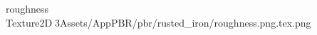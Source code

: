 	   roughness             	   Texture2D   3   Assets/AppPBR/pbr/rusted_iron/roughness.png.tex.png